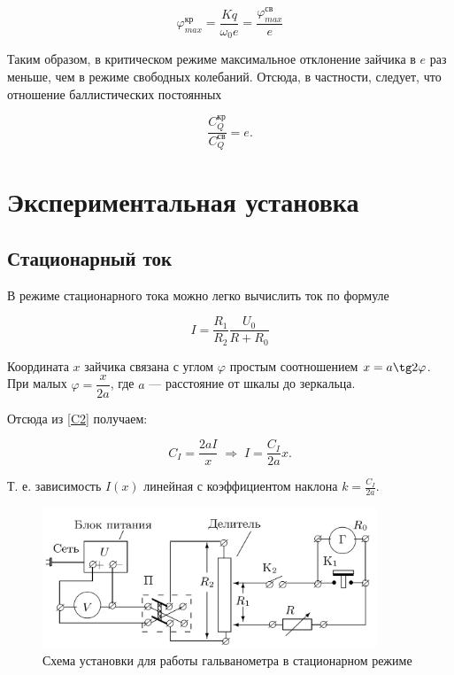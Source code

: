 \documentclass[12pt,a4paper]{article}
\begin{document}
	\begin{equation}\label{bal2}
	\varphi_{max}^\text{кр} = \dfrac{Kq}{\omega_0 e} = \frac{\varphi_{max}^\text{св}}{e}
	\end{equation}
	
	Таким образом, в критическом режиме максимальное отклонение зайчика в $ e $ раз меньше, чем в режиме свободных колебаний. Отсюда, в частности,  следует, что отношение баллистических постоянных
	
	\begin{equation}\label{}
	\dfrac{C_{Q}^\text{кр}}{C_{Q}^\text{св}} = e.
	\end{equation}
	


	\section*{Экспериментальная установка}

	\subsection*{Стационарный ток}
	
	В режиме стационарного тока можно легко вычислить ток по формуле 
	
	\begin{equation}\label{I}
	I = \dfrac{R_1}{R_2} \dfrac{U_0}{R + R_0}
	\end{equation}
	
	Координата $ x $ зайчика связана с углом $ \varphi $ простым соотношением $ x = a\tg 2\varphi $. При малых $ \varphi  =  \dfrac{x}{2a}$, где $ a $ --- расстояние от шкалы до зеркальца. 
	
	Отсюда из \eqref{C2} получаем:
	
	\begin{equation}
	C_I = \frac{2 a I}{x} \; \Rightarrow \; I = \frac{C_I}{2a}x.
	\label{eq:din}
	\end{equation}
	
    Т. е. зависимость $I(x)$ линейная с коэффициентом наклона $k=\frac{C_I}{2a}$.
    
    \begin{figure}[h!]
    	\centering
    	\includegraphics[width=10cm]{res/scheme1.png}
    	\caption{Схема установки для работы гальванометра в стационарном режиме}
    	\label{s1}
    \end{figure}
\end{document}

